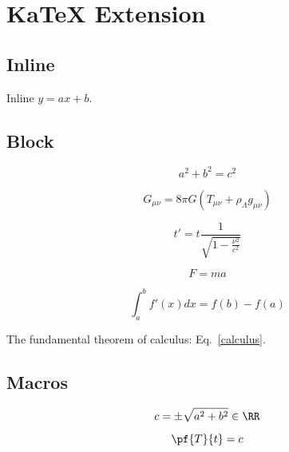 
\chapter{\label{katex-extension}KaTeX Extension}
\section{\label{inline}Inline}
\par Inline $y=ax+b$.
\section{\label{block}Block}
\par 
\begin{equation*}
a^2 + b^2 = c^2
\end{equation*}

\par 
\begin{equation*}
G_{\mu\nu} = 8\pi G(T_{\mu\nu} + \rho_{\Lambda} g_{\mu\nu})
\end{equation*}

\par 
\begin{equation*}
t' = t \frac{1}{\sqrt{1 - \frac{\nu^2}{c^2}}}
\end{equation*}

\par 
\begin{equation*}
F = ma
\end{equation*}
 
\par 
\begin{equation}
\label{calculus}
 \int_a^b f'(x)dx = f(b) - f(a)
\end{equation}

\par The fundamental theorem of calculus: Eq.~\eqref{calculus}.
\section{\label{macros}Macros}
\par 
\begin{equation*}
c = \pm\sqrt{a^2 + b^2}\in\RR
\end{equation*}

\par 
\begin{equation*}
\pf{T}{t} = c
\end{equation*}
 